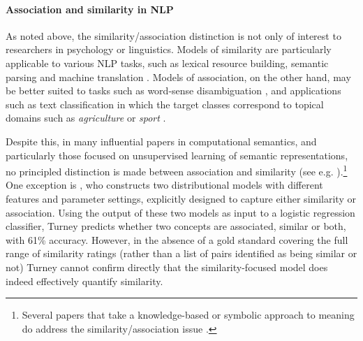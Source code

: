 

\paragraph{Association and similarity in NLP}  As noted above, the similarity/association distinction is not only of interest to researchers in psychology or linguistics. Models of similarity are particularly applicable to various NLP tasks, such as lexical resource building, semantic parsing and machine translation \cite{he2008indirect,Haghighi2008Learning,marton2009improved,beltagysemantic}. Models of association, on the other hand, may be better suited to tasks such as word-sense disambiguation \cite{navigli2009word}, and applications such as text classification \cite{phan2008learning} in which the target classes correspond to topical domains such as \emph{agriculture} or \emph{sport} \cite{rose2002reuters}. 

Despite this, in many influential papers in computational semantics, and particularly those focused on unsupervised learning of semantic representations, no principled distinction is made between association and similarity (see e.g. \cite{huang2012improving,reisinger2010multi,luong2013better}).\footnote{Several papers that take a knowledge-based or symbolic approach to meaning do address the similarity/association issue \cite{budanitsky2006evaluating}.} One exception is \cite{turney2012domain}, who constructs two distributional models with different features and parameter settings, explicitly designed to capture either similarity or association. Using the output of these two models as input to a logistic regression classifier, Turney predicts whether two concepts are associated, similar or both, with 61\% accuracy. However, in the absence of a gold standard covering the full range of similarity ratings (rather than a list of pairs identified as being similar or not) Turney cannot confirm directly that the similarity-focused model does indeed effectively quantify similarity. 

